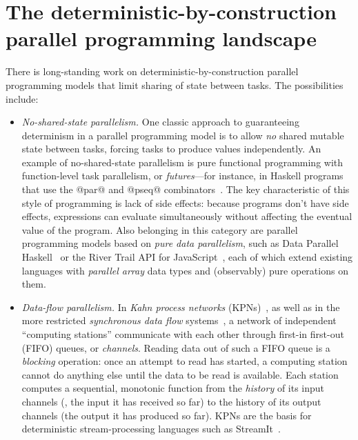 \section{The deterministic-by-construction parallel programming landscape}\label{s:intro-landscape}

There is long-standing work on deterministic-by-construction parallel
programming models that limit sharing of state between tasks. The
possibilities include:

\begin{itemize}
\item \emph{No-shared-state parallelism.}  One classic approach to
  guaranteeing determinism in a parallel programming model is to allow
  \emph{no} shared mutable state between tasks, forcing tasks to
  produce values independently.  An example of no-shared-state
  parallelism is pure functional programming with function-level task
  parallelism, or \emph{futures}---for instance, in Haskell programs
  that use the @par@ and @pseq@ combinators~\cite{marlow-par}.  The
  key characteristic of this style of programming is lack of side
  effects: because programs don't have side effects, expressions can
  evaluate simultaneously without affecting the eventual value of the
  program.  Also belonging in this category are parallel programming
  models based on \emph{pure data parallelism}, such as Data Parallel
  Haskell~\cite{dph, dph-status} or the River Trail API for
  JavaScript~\cite{river-trail}, each of which extend existing
  languages with \emph{parallel array} data types and (observably)
  pure operations on them.  

\item \emph{Data-flow parallelism.}  In \emph{Kahn process networks}
  (KPNs)~\cite{Kahn-1974}, as well as in the more restricted
  \emph{synchronous data flow} systems~\cite{Lee-sdn}, a network of
  independent ``computing stations'' communicate with each other
  through first-in first-out (FIFO) queues, or \emph{channels}.
  Reading data out of such a FIFO queue is a \emph{blocking}
  operation: once an attempt to read has started, a computing station
  cannot do anything else until the data to be read is available.
  Each station computes a sequential, monotonic function from the
  \emph{history} of its input channels (\ie, the input it has received
  so far) to the history of its output channels (the output it has
  produced so far).  KPNs are the basis for deterministic
  stream-processing languages such as StreamIt~\cite{streamit-asplos}.


\end{itemize}
